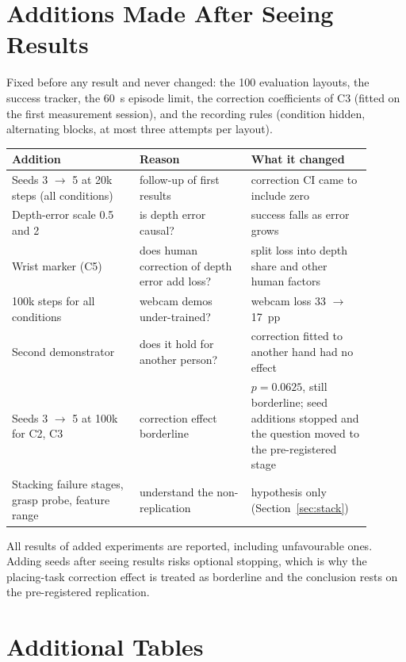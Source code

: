 \documentclass[10pt]{article}
\newcommand{\condII}{C2}
\newcommand{\condIII}{C3}
\newcommand{\condV}{C5}
\begin{document}



\appendix
\section{Additions Made After Seeing Results}
\label{app:posthoc}
Fixed before any result and never changed: the 100 evaluation layouts, the success tracker, the 60~s episode limit, the correction coefficients of \condIII{} (fitted on the first measurement session), and the recording rules (condition hidden, alternating blocks, at most three attempts per layout).

\begin{table}[h]
\centering
\small
\begin{tabular}{p{0.32\linewidth}p{0.28\linewidth}p{0.3\linewidth}}
\toprule
Addition & Reason & What it changed \\
\midrule
Seeds 3 $\to$ 5 at 20k steps (all conditions) & follow-up of first results & correction CI came to include zero \\
Depth-error scale 0.5 and 2 & is depth error causal? & success falls as error grows \\
Wrist marker (\condV) & does human correction of depth error add loss? & split loss into depth share and other human factors \\
100k steps for all conditions & webcam demos under-trained? & webcam loss 33 $\to$ 17~pp \\
Second demonstrator & does it hold for another person? & correction fitted to another hand had no effect \\
Seeds 3 $\to$ 5 at 100k for \condII, \condIII & correction effect borderline & $p = 0.0625$, still borderline; seed additions stopped and the question moved to the pre-registered stage \\
Stacking failure stages, grasp probe, feature range & understand the non-replication & hypothesis only (Section~\ref{sec:stack}) \\
\bottomrule
\end{tabular}
\end{table}

All results of added experiments are reported, including unfavourable ones. Adding seeds after seeing results risks optional stopping, which is why the placing-task correction effect is treated as borderline and the conclusion rests on the pre-registered replication.

\section{Additional Tables}
\end{document}
